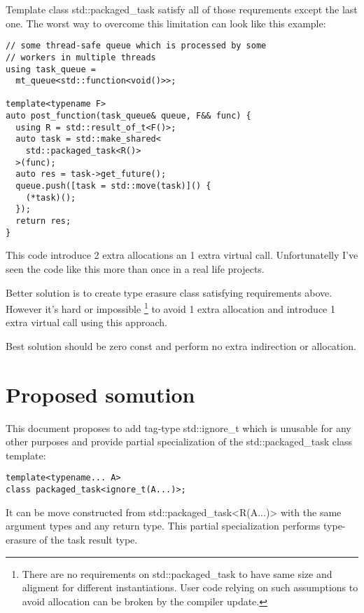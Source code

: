 \documentclass[ebook,openany,10pt,oneside,final]{memoir}
\begin{document}
Template class \mbox{std::packaged_task} satisfy all of those requrements except the last one. The
worst way to overcome this limitation can look like this example:

\begin{lstlisting}
// some thread-safe queue which is processed by some
// workers in multiple threads
using task_queue =
  mt_queue<std::function<void()>>;

template<typename F>
auto post_function(task_queue& queue, F&& func) {
  using R = std::result_of_t<F()>;
  auto task = std::make_shared<
    std::packaged_task<R()>
  >(func);
  auto res = task->get_future();
  queue.push([task = std::move(task)]() {
    (*task)();
  });
  return res;
}
\end{lstlisting}

This code introduce 2 extra allocations an 1 extra virtual call. Unfortunatelly I've seen the code
like this more than once in a real life projects.

Better solution is to create type erasure class satisfying requirements above. However it's hard or
impossible \footnote{There are no requirements on \mbox{std::packaged_task} to have same size and
aligment for different instantiations. User code relying on such assumptions to avoid allocation
can be broken by the compiler update.} to avoid 1 extra allocation and introduce 1 extra virtual
call using this approach.

Best solution should be zero const and perform no extra indirection or allocation.

\section{Proposed somution}

This document proposes to add tag-type \mbox{std::ignore_t} which is unusable for any other
purposes and provide partial specialization of the \mbox{std::packaged_task} class template:

\begin{lstlisting}
template<typename... A>
class packaged_task<ignore_t(A...)>;
\end{lstlisting}

It can be move constructed from \mbox{std::packaged_task<R(A...)>} with the same argument types
and any return type. This partial specialization performs type-erasure of the task result type.
\end{document}
